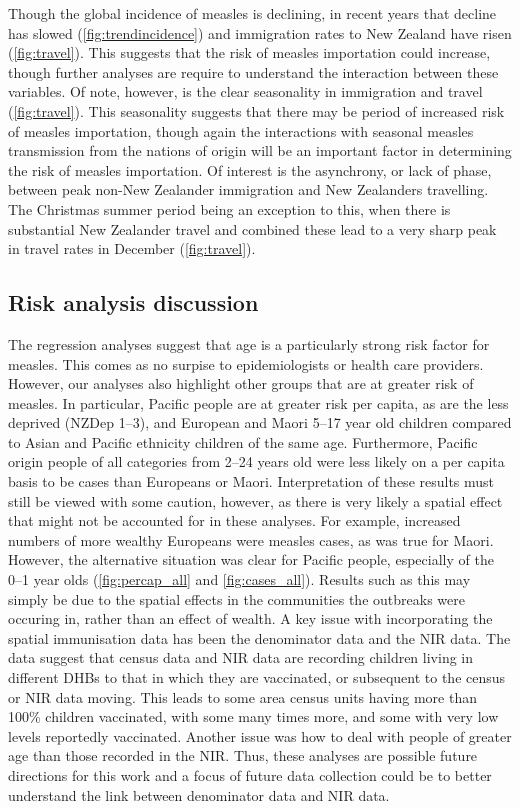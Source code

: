 \documentclass{article}
\begin{document}
Though the global incidence of measles is declining, in recent years that decline has slowed (\autoref{fig:trendincidence}) and immigration rates to New Zealand have risen (\autoref{fig:travel}). This suggests that the risk of measles importation could increase, though further analyses are require to understand the interaction between these variables.  Of note, however, is the clear seasonality in immigration and travel (\autoref{fig:travel}).  This seasonality suggests that there may be period of increased risk of measles importation, though again the interactions with seasonal measles transmission from the nations of origin will be an important factor in determining the risk of measles importation. Of interest is the asynchrony, or lack of phase, between peak non-New Zealander immigration and New Zealanders travelling. The Christmas summer period being an exception to this, when there is substantial New Zealander travel and combined these lead to a very sharp peak in travel rates in December (\autoref{fig:travel}).

\subsection*{Risk analysis discussion}

The regression analyses suggest that age is a particularly strong risk factor for measles. This comes as no surpise to epidemiologists or health care providers. However, our analyses also highlight other groups that are at greater risk of measles. In particular, Pacific people are at greater risk per capita, as are the less deprived (NZDep 1--3), and European and Maori 5--17 year old children compared to Asian and Pacific ethnicity children of the same age. Furthermore, Pacific origin people of all categories from 2--24 years old were less likely on a per capita basis to be cases than Europeans or Maori. Interpretation of these results must still be viewed with some caution, however, as there is very likely a spatial effect that might not be accounted for in these analyses. For example, increased numbers of more wealthy Europeans were measles cases, as was true for Maori. However, the alternative situation was clear for Pacific people, especially of the 0--1 year olds (\autoref{fig:percap_all} and \autoref{fig:cases_all}). Results such as this may simply be due to the spatial effects in the communities the outbreaks were occuring in, rather than an effect of wealth. A key issue with incorporating the spatial immunisation data has been the denominator data and the NIR data. The data suggest that census data and NIR data are recording children living in different DHBs to that in which they are vaccinated, or subsequent to the census or NIR data moving. This leads to some area census units having more than 100\% children vaccinated, with some many times more, and some with very low levels reportedly vaccinated. Another issue was how to deal with people of greater age than those recorded in the NIR. Thus, these analyses are possible future directions for this work and a focus of future data collection could be to better understand the link between denominator data and NIR data. 
\end{document}
